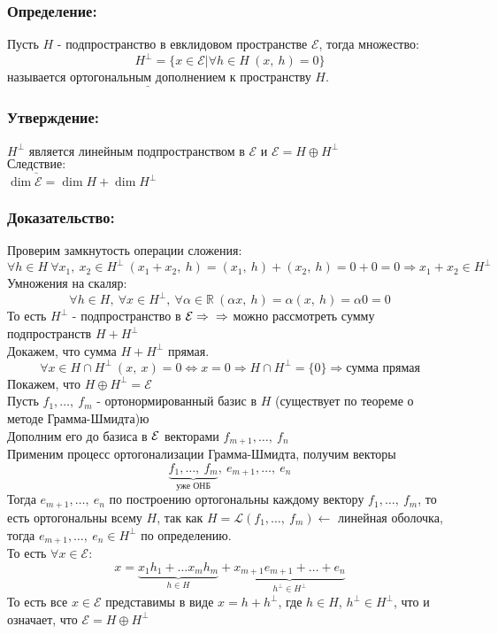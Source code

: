 \documentclass[12pt, letterpaper, twoside]{article}
\newcommand{\Underl}[1]{$\underline{\text{#1}}$}
\begin{document}
    \subsubsection*{Определение:}
    Пусть $H$ - подпространство в евклидовом пространстве $\mathcal{E}$, тогда множество:
    \[H^{\bot} = \big\{ x\in \mathcal{E} \big|\forall h\in H\ (x,\ h) = 0 \big\}\]
    называется \Underl{ортогональным дополнением} к пространству $H$.
    \subsubsection*{Утверждение:}
    $H^{\bot}$ является линейным подпространством в $\mathcal{E}$ и $\mathcal{E} = H\oplus H^{\bot}$\\
    \Underl{Следствие:}\\
    $\dim \mathcal{E} = \dim H + \dim H^{\bot}$
    \subsubsection*{Доказательство:}
    Проверим замкнутость операции сложения:
    \[\forall h\in H\ \forall x_1,\ x_2\in H^{\bot}\ (x_1 + x_2,\ h) = (x_1,\ h) + (x_2,\ h) = 0 + 0 = 0\Rightarrow x_1 + x_2 \in H^{\bot}\]
    Умножения на скаляр:
    \[\forall h\in H,\ \forall x\in H^{\bot},\ \forall \alpha \in \mathbb{R}\ (\alpha x,\ h) = \alpha(x,\ h) = \alpha0 = 0\]
    То есть $H^{\bot}$ - подпространство в $\mathcal{E}\Rightarrow\\
    \Rightarrow$ можно рассмотреть сумму подпространств $H + H^{\bot}$\\
    Докажем, что сумма $H+ H^{\bot}$ прямая.\\
    \[\forall x\in H\cap H^{\bot}\ (x,\ x) = 0\Leftrightarrow x=0\Rightarrow H\cap H^{\bot} = \{0\}\Rightarrow \text{сумма прямая}\]
    Покажем, что $H\oplus H^{\bot} = \mathcal{E}$\\
    Пусть $f_1,\dots,\ f_m$ - ортонормированный базис в $H$ (существует по теореме о методе Грамма-Шмидта)ю\\
    Дополним его до базиса в $\cal{E}$ векторами $f_{m + 1},\dots,\ f_n$\\
    Применим процесс ортогонализации Грамма-Шмидта, получим векторы \[\underset{\text{уже ОНБ}}{\underbrace{f_1,\dots,\ f_m}},\ e_{m + 1},\dots,\ e_n\]
    Тогда $e_{m + 1},\dots,\ e_n$ по построению ортогональны каждому вектору $f_1,\dots,\ f_m$, то есть ортогональны всему $H$, так как $H = \mathcal{L}(f_1,\dots,\ f_m)\leftarrow$ линейная оболочка, тогда $e_{m + 1},\dots,\ e_n\in H^{\bot}$ по определению.\\
    То есть $\forall x\in \mathcal{E}$:
    \[x = \underset{h\in H}{\underbrace{x_1 h_1 +\dots x_m h_m}} + \underset{h^{\bot}\in H^{\bot}}{\underbrace{x_{m + 1} e_{m + 1} + \dots + e_n}}\]
    То есть все $x\in \mathcal{E}$ представимы в виде $x = h + h^{\bot}$, где $h\in H$, $h^{\bot}\in H^{\bot}$, что и означает, что $\mathcal{E} = H\oplus H^{\bot}$
\end{document}
